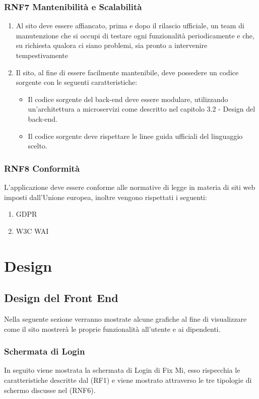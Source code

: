 \documentclass{report}
\begin{document}
\subsection*{RNF7 Mantenibilità e Scalabilità}
\begin{enumerate}
	\item Al sito deve essere affiancato, prima e dopo il rilascio ufficiale, un team di manutenzione che si occupi di testare ogni funzionalità periodicamente e che, su richiesta qualora ci siano problemi, sia pronto a intervenire tempestivamente
	\item Il sito, al fine di essere facilmente mantenibile, deve possedere un codice sorgente con le seguenti caratteristiche:
	\begin{itemize}
		\item Il codice sorgente del back-end deve essere modulare, utilizzando un'architettura a microservizi come descritto nel capitolo 3.2 - Design del back-end.
		\item Il codice sorgente deve rispettare le linee guida ufficiali del linguaggio scelto.
	
	\end{itemize} 
\end{enumerate}
\subsection*{RNF8 Conformità}
L'applicazione deve essere conforme alle normative di legge in materia di siti web imposti dall'Unione europea, inoltre vengono rispettati i seguenti:
\begin{enumerate}
	\item GDPR
	\item W3C WAI
\end{enumerate}
\chapter{Design}

\section{Design del Front End}

Nella seguente sezione verranno mostrate alcune grafiche al fine di visualizzare come il sito mostrerà le proprie funzionalità all’utente e ai dipendenti.

\subsection*{Schermata di Login}
In seguito viene mostrata la schermata di Login di Fix Mi, esso rispecchia le caratteristiche descritte dal (RF1) e viene mostrato attraverso le tre tipologie di schermo discusse nel (RNF6). 
\end{document}
